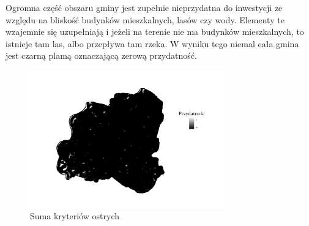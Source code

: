 \documentclass{article}
\begin{document}
Ogromna część obszaru gminy jest zupełnie nieprzydatna do inwestycji ze względu na bliskość budynków mieszkalnych, lasów czy wody. Elementy te wzajemnie się uzupełniają i jeżeli na terenie nie ma budynków mieszkalnych, to istnieje tam las, albo przepływa tam rzeka. W wyniku tego niemal cała gmina jest czarną plamą oznaczającą zerową przydatność.

\begin{figure}[H]
    \centering
    \includegraphics[width=0.75\textwidth]{img/plesna-ostre-layout.jpg}
    \caption{Suma kryteriów ostrych}
\end{figure}
\end{document}
